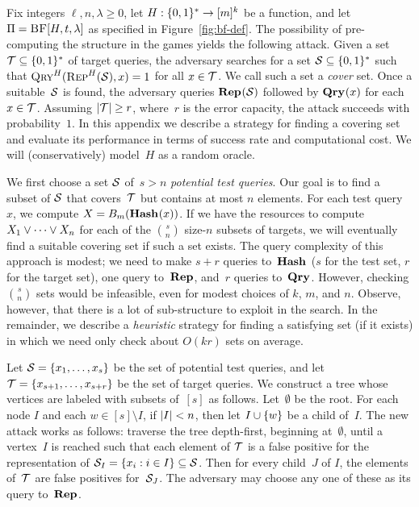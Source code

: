 \label{app:unsalted-attack}
Fix integers $\ell, n, \lambda \geq0$, let $H:\{0,1\}^*\to[m]^k$ be a function,  and let
$\Pi = \textnormal{\textsc{BF}}[H,t,\lambda]$ as specified in Figure~\ref{fig:bf-def}.
%
The possibility of pre-computing the structure in the  games yields the
following attack. Given a set $\mathcal{T}\subseteq\{0,1\}^*$ of target queries, the
adversary searches for a set $\mathcal{S}\subseteq\{0,1\}^*$ such that
$\textnormal{\textsc{Qry}}^H(\textnormal{\textsc{Rep}}^H(\mathcal{S}), x) = 1$ for all $x \in \mathcal{T}$. We call such a set a
\emph{cover} set.
%
Once a suitable~$\mathcal{S}$ is found, the adversary queries $\textup{\textbf{Rep}}\hspace{0.5pt}(\mathcal{S})$ followed
by $\textup{\textbf{Qry}}\hspace{0.5pt}(x)$ for each $x\in\mathcal{T}$.
%
Assuming $|\mathcal{T}| \geq r$, where~$r$ is the error capacity, the attack succeeds
with probability~$1$.
%
In this appendix we describe a strategy for finding a covering set and evaluate
its performance in terms of success rate and computational cost. We will
(conservatively) model~$H$ as a random oracle.

We first choose a set $\mathcal{S}$ of~$s > n$ \emph{potential test queries}. Our goal is to find a subset of $\mathcal{S}$ that covers~$\mathcal{T}$ but contains at most $n$ elements.
%
For each test query~$x$, we compute $X = {B}_m(\textup{\textbf{Hash}}\hspace{0.5pt}(x))$. If we have the
resources to compute $X_1 \vee \cdots \vee X_n$ for each of the ${s}\choose{n}$
size-$n$ subsets of targets, we will eventually find a suitable covering set if
such a set exists.
%
The query complexity of this approach is modest; we need to make $s+r$ queries
to~$\textup{\textbf{Hash}}\hspace{0.5pt}$ ($s$ for the test set, $r$ for the target set), one query
to~$\textup{\textbf{Rep}}\hspace{0.5pt}$, and~$r$ queries to~$\textup{\textbf{Qry}}\hspace{0.5pt}$. However, checking $\binom{s}{n}$ sets
would be infeasible, even for modest choices of $k$, $m$, and $n$. Observe,
however, that there is a lot of sub-structure to exploit in the search.
%
In the remainder, we describe a \emph{heuristic} strategy for finding a
satisfying set (if it exists) in which we need only check about $O(kr)$ sets on
average.

Let $\mathcal{S} = \{x_1, \ldots, x_s\}$ be the set of potential test queries, and let $\mathcal{T} =
\{x_{s+1}, \ldots, x_{s+r}\}$ be the set of target queries.
%
We construct a tree whose vertices are labeled with subsets of~$[s]$ as follows.
%
Let~$\emptyset$ be the root.
%
For each node $I$ and each $w \in [s] \setminus I$, if $|I| < n$, then let $I
\cup \{ w \}$ be a child of~$I$.
%
The new attack works as follows: traverse the tree depth-first, beginning
at~$\emptyset$, until a vertex~$I$ is reached such that each element of $\mathcal{T}$ is
a false positive for the representation of $\mathcal{S}_I = \{ x_i : i \in I \}
\subseteq \mathcal{S}$.
%
Then for every child~$J$ of $I$, the elements of~$\mathcal{T}$ are false positives
for~$\mathcal{S}_J$. The adversary may choose any one of these as its query
to~$\textup{\textbf{Rep}}\hspace{0.5pt}$.


